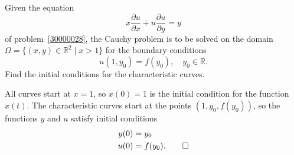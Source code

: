 Given the equation
\[
x
\frac{\partial u}{\partial x}
+
u
\frac{\partial u}{\partial y}
=
y
\]
of problem~\ref{30000028}, the Cauchy problem is to be solved on the
domain $\Omega = \{(x,y)\in\mathbb{R}^2 \mid x>1\}$
for the
boundary conditions
\[
u(1,y_0)
=
f(y_0),\quad y_0\in\mathbb{R}.
\]
Find the initial conditions for the characteristic curves.

\begin{loesung}
All curves start at $x=1$, so $x(0)=1$ is the initial condition for the
function $x(t)$.
The characteristic curves start at the points
$(1,y_0,f(y_0))$, so the functions $y$ and $u$ satisfy initial
conditions
\begin{align*}
y(0) &= y_0       \\
u(0) &= f(y_0).
\qedhere
\end{align*}
\end{loesung}
